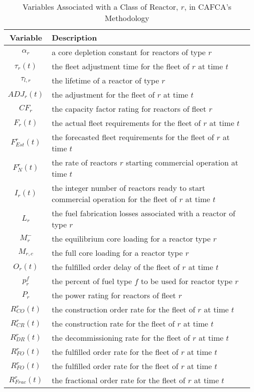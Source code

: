 \begin{table} [h!]
\centering
\begin{tabularx}{\textwidth-20pt}{|c|X|} %
\hline
Variable    & Description \\
\hline
$\alpha_r$       & a core depletion constant for reactors of type $r$  \\
$\tau_r(t)$      & the fleet adjustment time for the fleet of $r$ at time $t$  \\
$\tau_{l,r}$     & the lifetime of a reactor of type $r$  \\
$ADJ_r(t)$       & the adjustment for the fleet of $r$ at time $t$  \\
$CF_r$           & the capacity factor rating for reactors of fleet $r$ \\
$F_r(t)$         & the actual fleet requirements for the fleet of $r$ at time $t$  \\
$F^r_{Est}(t)$   & the forecasted fleet requirements for the fleet of $r$ at time $t$  \\
$F^r_N(t)$       & the rate of reactors $r$ starting commercial operation at time $t$ \\
$I_r(t)$         & the integer number of reactors ready to start commercial operation for the fleet of $r$ at time $t$  \\
$L_r$            & the fuel fabrication losses associated with a reactor of type $r$   \\
$M^-_r$          & the equilibrium core loading for a reactor type $r$   \\
$M_{r,c}$       & the full core loading for a reactor type $r$   \\
$O_r(t)$         & the fulfilled order delay of the fleet of $r$ at time $t$ \\
$p^f_r$          & the percent of fuel type $f$ to be used for reactor type $r$ \\
$P_r$            & the power rating for reactors of fleet $r$ \\
$R^r_{CO}(t)$    & the construction order rate for the fleet of $r$ at time $t$  \\
$R^r_{CR}(t)$    & the construction rate for the fleet of $r$ at time $t$  \\
$R^r_{DR}(t)$    & the decommissioning rate for the fleet of $r$ at time $t$  \\
$R^r_{FO}(t)$    & the fulfilled order rate for the fleet of $r$ at time $t$  \\
$R^r_{FO}(t)$    & the fulfilled order rate for the fleet of $r$ at time $t$  \\
$R^r_{Frac}(t)$  & the fractional order rate for the fleet of $r$ at time $t$ \\
\hline
\end{tabularx}
\caption{Variables Associated with a Class of Reactor, $r$, in CAFCA's Methodology}
\label{tbl:cafca-rxtr-vars}
\end{table}


